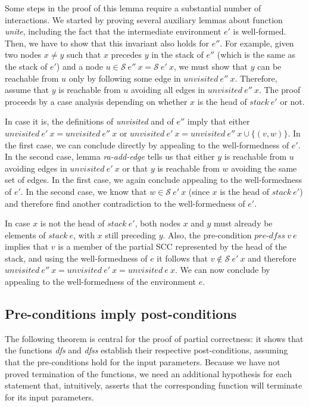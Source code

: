 \documentclass[sigplan,10pt,anonymous,review]{acmart}
\newcommand{\prog}[1]{\textit{#1}}
\renewcommand{\SS}{\mathcal{S}}
\begin{document}
Some steps in the proof of this lemma require a substantial number of interactions. We started by proving several auxiliary lemmas about function \prog{unite}, including the fact that the intermediate environment $e'$ is well-formed. Then, we have to show that this invariant also holds for $e''$. For example, given two nodes $x \neq y$ such that $x$ precedes $y$ in the stack of $e''$ (which is the same as the stack of $e'$) and a node $u \in \SS~e''~x = \SS~e'~x$, we must show that $y$ can be reachable from $u$ only by following some edge in $\prog{unvisited}~e''~x$. Therefore, assume that $y$ is reachable from $u$ avoiding all edges in $\prog{unvisited}~e''~x$. The proof proceeds by a case analysis depending on whether $x$ is the head of $\prog{stack}~e'$ or not.

In case it is, the definitions of \prog{unvisited} and of $e''$ imply that either $\prog{unvisited}~e'~x = \prog{unvisited}~e''~x$ or $\prog{unvisited}~e'~x = \prog{unvisited}~e''~x \cup \{(v,w)\}$. In the first case, we can conclude directly by appealing to the well-formedness of $e'$. In the second case, lemma \prog{ra-add-edge} tells us that either $y$ is reachable from $u$ avoiding edges in $\prog{unvisited}~e'~x$ or that $y$ is reachable from $w$ avoiding the same set of edges. In the first case, we again conclude appealing to the well-formedness of $e'$. In the second case, we know that $w \in \SS~e'~x$ (since $x$ is the head of $\prog{stack}~e'$) and therefore find another contradiction to the well-formedness of $e'$.

In case $x$ is not the head of $\prog{stack}~e'$, both nodes $x$ and $y$ must already be elements of $\prog{stack}~e$, with $x$ still preceding $y$. Also, the pre-condition $\prog{pre-dfss}~v~e$ implies that $v$ is a member of the partial SCC represented by the head of the stack, and using the well-formedness of $e$ it follows that $v \notin \SS~e'~x$ and therefore $\prog{unvisited}~e''~x = \prog{unvisited}~e'~x = \prog{unvisited}~e~x$. We can now conclude by appealing to the well-formedness of the environment $e$.


\subsection{Pre-conditions imply post-conditions}
\label{sec:pre-post}

The following theorem is central for the proof of partial correctness: it shows that the functions \prog{dfs} and \prog{dfss} establish their respective post-conditions, assuming that the pre-conditions hold for the input parameters. Because we have not proved termination of the functions, we need an additional hypothesis for each statement that, intuitively, asserts that the corresponding function will terminate for its input parameters.
\end{document}
